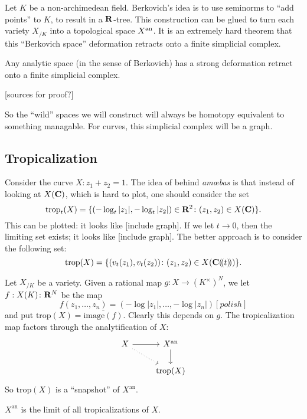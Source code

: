 Let $K$ be a non-archimedean field. Berkovich's idea is to use seminorms 
to ``add points'' to $K$, to result in a $\mathbf{R}$-tree. This construction 
can be glued to turn each variety $X_{/K}$ into a topological space 
$X^{\mathrm{an}}$. It is an extremely 
hard theorem that this ``Berkovich space'' deformation retracts onto a 
finite simplicial complex. 

\begin{theorem}
Any analytic space (in the sense of Berkovich) has a strong deformation retract 
onto a finite simplicial complex. 
\end{theorem}

[sources for proof?]

So the ``wild'' spaces we will construct will always be homotopy equivalent to 
something managable. For curves, this simplicial complex will be a graph. 





\subsection{Tropicalization}

Consider the curve $X:z_1+z_2=1$. The idea of behind \emph{am\oe{}bas} is that 
instead of looking at $X(\mathbf{C})$, which is hard to plot, one should consider the 
set 
\[
  \mathrm{trop}_t(X) = \{(-\log_t|z_1|,-\log_t|z_2|)\in \mathbf{R}^2\colon (z_1,z_2)\in X(\mathbf{C})\} .
\]
This can be plotted: it looks like [include graph]. If we let $t\to 0$, then 
the limiting set exists; it looks like [include graph]. The better approach is 
to consider the following set: 
\[
  \mathrm{trop}(X)=\{(v_t(z_1),v_t(z_2))\colon (z_1,z_2)\in X(\mathbf{C}(\!( t)\!))\} .
\]

Let $X_{/K}$ be a variety. Given a rational map 
$g\colon X\to (K^\times)^N$, we let 
$f:X(K)\colon \mathbf{R}^N$ be the map 
\[
  f(z_1,\dots,z_n) = (-\log|z_1|,\dots,-\log|z_n|) [polish]
\]
and put $\mathrm{trop}(X) = \overline{\mathrm{image}(f)}$. Clearly this depends on 
$g$. The tropicalization map factors through the analytification of $X$: 
\[
\begin{tikzcd}
  X \ar[r] \ar[dr, dotted]
    & X^\mathrm{an} \ar[d] \\
  & \mathrm{trop}(X)
\end{tikzcd}
\]
So $\mathrm{trop}(X)$ is a ``snapshot'' of $X^\mathrm{an}$. 

\begin{theorem}
$X^\mathrm{an}$ is the limit of all tropicalizations of $X$. 
\end{theorem}


